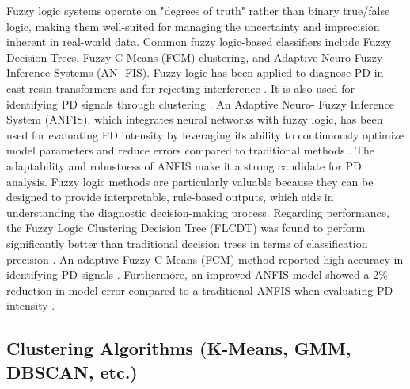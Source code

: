 Fuzzy logic systems operate on "degrees of truth" rather than binary true/false logic, making them well-suited for managing the uncertainty and imprecision inherent in real-world data. Common fuzzy logic-based classifiers include Fuzzy Decision Trees, Fuzzy C-Means (FCM) clustering, and Adaptive Neuro-Fuzzy Inference Systems (AN- FIS). Fuzzy logic has been applied to diagnose PD in cast-resin transformers \parencite{Lee_2020_1} and for rejecting interference \parencite{Wang_2019_3}. It is also used for identifying PD signals through clustering \parencite{Chen_2017_2}. An Adaptive Neuro- Fuzzy Inference System (ANFIS), which integrates neural networks with fuzzy logic, has been used for evaluating PD intensity by leveraging its ability to continuously optimize model parameters and reduce errors compared to traditional methods \parencite{Wang_2019_3}. The adaptability and robustness of ANFIS make it a strong candidate for PD analysis. Fuzzy logic methods are particularly valuable because they can be designed to provide interpretable, rule-based outputs, which aids in understanding the diagnostic decision-making process. Regarding performance, the Fuzzy Logic Clustering Decision Tree (FLCDT) was found to perform significantly better than traditional decision trees in terms of classification precision \parencite{Lee_2020_1}. An adaptive Fuzzy C-Means (FCM) method reported high accuracy in identifying PD signals \parencite{Chen_2017_2}. Furthermore, an improved ANFIS model showed a 2\% reduction in model error compared to a traditional ANFIS when evaluating PD intensity \parencite{Wang_2019_3}.

\subsection{Clustering Algorithms (K-Means, GMM, DBSCAN, etc.)}

